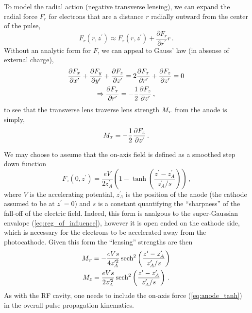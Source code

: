To model the radial action (negative transverse lensing), we can expand the radial force $F_r$ for electrons that are a distance $r$ radially outward from the center of the pulse,
\begin{equation}
  F_r(r,z^{\prime}) \approx F_r(r,z^{\prime}) + \frac{\partial F_r}{\partial r^{\prime}} r \,\text{.}
\end{equation}
Without an analytic form for $F$, we can appeal to Gauss' law (in absense of external charge),
\begin{gather}
  \frac{\partial F_x}{\partial x^{\prime}} + \frac{\partial F_y}{\partial y^{\prime}} + \frac{\partial F_z}{\partial z^{\prime}} = 2 \frac{\partial F_{{\scriptscriptstyle T}}}{\partial r^{\prime}} + \frac{\partial F_z}{\partial z^{\prime}} = 0 \\
  \Rightarrow \frac{\partial F_{{\scriptscriptstyle T}}}{\partial r^{\prime}} = - \frac{1}{2} \frac{\partial F_z}{\partial z^{\prime}} \,\text{,}
\end{gather} 
to see that the transverse lens traverse lens strength $M_{{\scriptscriptstyle T}}$ from the anode is simply,
\begin{equation}
  M_{{\scriptscriptstyle T}} = -\frac{1}{2}\frac{\partial F_z}{\partial z^{\prime}} \, \text{.}
\end{equation}

We may choose to assume that the on-axis field is defined as a smoothed step down function
\begin{equation} \label{eq:anode_tanh}
  F_z(0,z^{\prime}) = \frac{eV}{2z^{\prime}_A} \left( 1 - \tanh \left( \frac{ z^{\prime} - z^{\prime}_A }{ z^{\prime}_A / s } \right) \right) \,\text{,}
\end{equation}
where $V$ is the accelerating potential, $z^{\prime}_A$ is the position of the anode (the cathode assumed to be at $z^{\prime} = 0$) and $s$ is a constant quantifying the ``sharpness'' of the fall-off of the electric field.
Indeed, this form is analgous to the super-Gaussian envalope (\ref{eq:reg_of_influence}), however it is open ended on the cathode side, which is necessary for the electrons to be accelerated away from the photocathode.
Given this form the ``lensing'' strengths are then
\begin{gather}
  M_{{\scriptscriptstyle T}} = -\frac{eVs}{4z^{\prime 2}_A} \operatorname{sech}^2 \left( \frac{z^{\prime} - z^{\prime}_A }{ z^{\prime}_A / s } \right) \\
  M_z = \frac{eVs}{2z^{\prime 2}_A} \operatorname{sech}^2 \left( \frac{z^{\prime} - z^{\prime}_A }{ z^{\prime}_A / s } \right) \, \text{.}
\end{gather}
As with the RF cavity, one needs to include the on-axis force (\ref{eq:anode_tanh}) in the overall pulse propagation kinematics.

